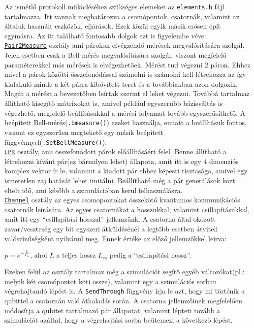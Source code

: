 Az ismétlő protokoll működéséhez szükséges elemeket az \texttt{elements.h} fájl tartalmazza. Itt vannak meghatározva a csomópontok, csatornák, valamint az általuk használt eszközök, eljárások. Ezek közül egyik másik erősen épít egymásra. Az itt található fontosabb dolgok ezt is figyelembe véve:\\
\underline{\texttt{Pair2Measure}} osztály ami párokon elvégzendő mérések megvalósítására szolgál. Jelen esetben csak a Bell-mérés megvalósítására szolgál, viszont megfelelő paraméterekkel más mérések is elvégezhetőek. Mérést tud végezni 2 páron.  Ehhez mivel a párok közötti összefonódással számolni is számolni kell létrehozza az így kialakuló minde a két párra kibővített teret és a továbbiakban azon dolgozik. Magát a mérést a bevezetőben leírtak szerint el lehet végezni. Továbbá tartalmaz állítható kisegítő mátrixokat is, amivel például egyszerűbb bázisváltás is végezhető, megfelelő beállításukkal a mérési folyamat tovább egyszerűsíthető. A beépített Bell-mérés(\texttt{.bmeasure()}) ezeket használja, emiatt a beállításuk fontos, viszont ez egyszerűen megtehető egy másik beépített függvénnyel(\texttt{.SetBellMeasure()}).\\
\underline{\texttt{EPR}} osztály, ami összefonódott párok előállításáért felel. Benne állítható a létrehozni kívánt pár(ez bármilyen lehet) állapota, amit itt is egy 4 dimenziós komplex vektor ír le, valamint a kiadott pár ehhez képesti tisztasága, amivel egy ismeretlen zaj hatását lehet imitálni. Beállítható még a pár generálások közt eltelt idő, ami később a szimulációban kerül felhasználásra.\\
\underline{\texttt{Channel}} osztály az egyes csomopontokat összekötő kvantumos kommunikációs csatornák leírására. Az egyes csatornákat a hosszukkal, valamint csillapításukkal, amit itt egy ``csillapítási hosszal'' jellemzünk. A csatorna által okozott zavar/veszteség egy bit egyszeri átküldésénél a legtöbb esetben átviteli valószínűségként nyilvánul meg. Ennek értéke az előző jellemzőkkel leírva:\\
\begin{center}
$ p=e^{-\frac{L}{L_{cs}}}$, ahol $L$ a teljes hossz $L_{cs}$  pedig a ``csillapítási hossz''.\\
\end{center}
Ezeken felül az osztály tartalmaz még a szimulációt segítő egyéb változókat(pl.: melyik két csomópontot köti össze), valamint egy a szimulációs sorban végrehajtandó lépést is. A \texttt{SendThrough} függvény írja le azt, hogy mi történik a qubittel a csatornán való áthaladás során. A csatorna jellemzőinek megfelelően módosítja a qubitet tartalmazó pár állapotat, valamint lépteti tovább a szimulációt azáltal, hogy a végrehajtási sorba beütemezi a következő lépést.\\
